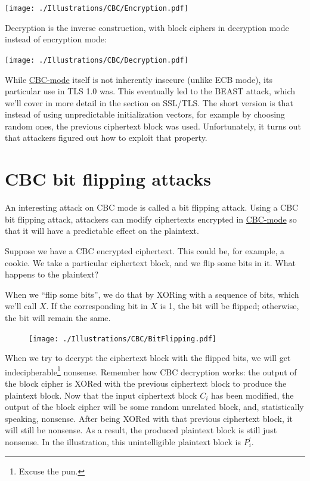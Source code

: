 \documentclass[11pt,ebook,table,dvipsnames]{memoir}
\begin{document}
\texttt{[image: ./Illustrations/CBC/Encryption.pdf]}

Decryption is the inverse construction, with block ciphers in
decryption mode instead of encryption mode:

\texttt{[image: ./Illustrations/CBC/Decryption.pdf]}

While \hyperref[CBC mode]{CBC-mode} itself is not inherently insecure (unlike ECB mode),
its particular use in TLS 1.0 was. This eventually led to the
\gls{BEAST} attack, which we'll cover in more detail in the section on
SSL/TLS. The short version is that instead of using unpredictable
\glspl{initialization vector}, for example by choosing random ones,
the previous ciphertext block was used. Unfortunately, it turns out
that attackers figured out how to exploit that property.
\section{\label{CBC-bit-flipping-attacks}CBC bit flipping attacks}
\label{sec-2-3-5}

An interesting attack on \gls{CBC mode} is called a bit flipping
attack. Using a CBC bit flipping attack, attackers can modify
ciphertexts encrypted in \hyperref[CBC mode]{CBC-mode} so that it will have a predictable
effect on the plaintext.

Suppose we have a CBC encrypted ciphertext. This could be, for
example, a cookie. We take a particular ciphertext block, and we flip
some bits in it. What happens to the plaintext?

When we \enquote{flip some bits}, we do that by XORing with a sequence of
bits, which we'll call $X$. If the corresponding bit in $X$ is 1, the
bit will be flipped; otherwise, the bit will remain the same.

\begin{figure}[h!]
\centering
\texttt{[image: ./Illustrations/CBC/BitFlipping.pdf]}
\end{figure}

When we try to decrypt the ciphertext block with the flipped bits, we
will get indecipherable\footnote{Excuse the pun.} nonsense. Remember how
CBC decryption works: the output of the block cipher is XORed with the
previous ciphertext block to produce the plaintext block. Now that the
input ciphertext block $C_i$ has been modified, the output of the
block cipher will be some random unrelated block, and, statistically
speaking, nonsense. After being XORed with that previous ciphertext
block, it will still be nonsense. As a result, the produced plaintext
block is still just nonsense. In the illustration, this unintelligible
plaintext block is $P_i^{\prime}$.
\end{document}
